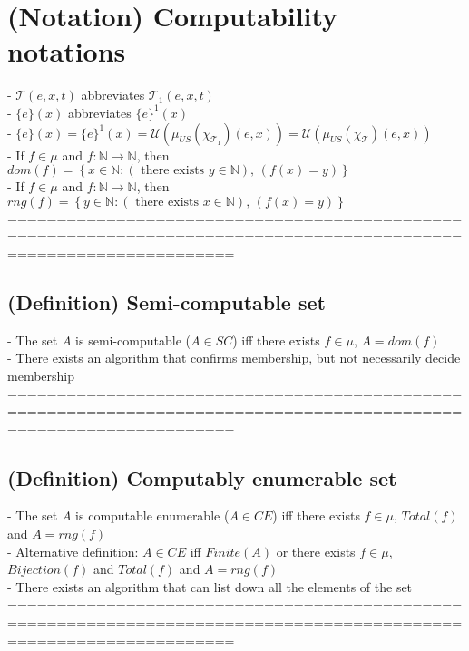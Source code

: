 \documentclass{book}
\newcommand{\txtexists}[2]{\left(\text{ there exists }#1\right)\text{, }\left(#2\right)}
\newcommand{\set}[1]{\left\{ #1 \right\}}
\begin{document}
\section{(Notation) Computability notations} %
	- $\mathcal{T}(e, x, t)$ abbreviates $\mathcal{T}_1(e, x, t)$ \\
	- $\{e\}(x)$ abbreviates $\{e\}^1(x)$ \\
	- $\{e\}(x) = \{e\}^1(x) = \mathcal{U}(\mu_{US}(\chi_{\mathcal{T}_1})(e, x)) = \mathcal{U}(\mu_{US}(\chi_{\mathcal{T}})(e, x))$ \\
	- If $f \in \mu$ and $f: \mathbb{N} \rightarrow \mathbb{N}$, then $dom(f) = \set{x \in \mathbb{N}: \txtexists{y \in \mathbb{N}}{f(x) = y}}$ \\
	- If $f \in \mu$ and $f: \mathbb{N} \rightarrow \mathbb{N}$, then $rng(f) = \set{y \in \mathbb{N}: \txtexists{x \in \mathbb{N}}{f(x) = y}}$ \\
	===================================================================================================================
\subsection{(Definition) Semi-computable set} %
	- The set $A$ is semi-computable ($A \in SC$) iff there exists $f \in \mu$, $A = dom(f)$ \\
	- There exists an algorithm that confirms membership, but not necessarily decide membership \\
	===================================================================================================================
\subsection{(Definition) Computably enumerable set} %
	- The set $A$ is computable enumerable ($A \in CE$) iff there exists $f \in \mu$, $Total(f)$ and $A = rng(f)$ \\
	- Alternative definition: $A \in CE$ iff $Finite(A)$ or there exists $f \in \mu$, $Bijection(f)$ and $Total(f)$ and $A = rng(f)$ \\
	- There exists an algorithm that can list down all the elements of the set \\
	===================================================================================================================
\end{document}
